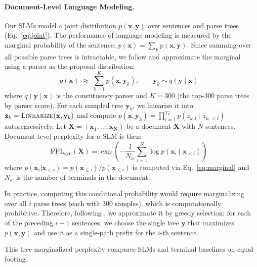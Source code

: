 \documentclass[11pt]{article}
\begin{document}
\paragraph{Document-Level Language Modeling.}
\label{sec:doc-ppl}
Our SLMs model a joint distribution $p(\mathbf{x}, \mathbf{y})$ over sentences and parse trees (Eq.~\ref{eq:joint}). The performance of language modeling is measured by the marginal probability of the sentence: $p(\mathbf{x}) = \sum_{\mathbf{y}} p(\mathbf{x}, \mathbf{y})$.
Since summing over all possible parse trees is intractable, we follow \citet{zhao-etal-2025-systematic} and approximate the marginal using a parser as the proposal distribution:
\begin{equation}
p(\mathbf{x}) \;\approx\; \sum_{k=1}^{K} p(\mathbf{x}, \mathbf{y}_k),
\qquad \mathbf{y}_k \sim q(\mathbf{y} \mid \mathbf{x})
\label{eq:marginal}
\end{equation}
\noindent where $q(\mathbf{y} \mid \mathbf{x})$ is the constituency parser and $K=300$ (the top-300 parse trees by parser score).
For each sampled tree $\mathbf{y}_k$, we linearize it into $\mathbf{z}_k = \textsc{Linearize}(\mathbf{x}, \mathbf{y}_k)$ and compute $p(\mathbf{x}, \mathbf{y}_k) = \prod_{t=1}^{T_k} p(z_{k,t} \mid z_{k,<t})$ autoregressively.
Let $\mathbf{X} = (\mathbf{x_1}, ..., \mathbf{x_N})$ be a document $\mathbf{X}$ with $N$ sentences. 
Document-level perplexity for a SLM is then:
\begin{equation}
\text{PPL}_{\text{syn}}(\mathbf{X}) = \exp\!\left( -\frac{1}{N_w} \sum_{i=1}^{N} \log p(\mathbf{x}_i \mid \mathbf{x}_{<i}) \right)
\label{eq:doc-ppl}
\end{equation}
\noindent where $p(\mathbf{x}_{i} | \mathbf{x}_{< i}) = p(\mathbf{x}_{\le i}) / p(\mathbf{x}_{< i})$ is computed via Eq.~\ref{eq:marginal} and $N_w$ is the number of terminals in the document. 

In practice, computing this conditional probability would require marginalizing over all $i$ parse trees (each with 300 samples), which is computationally prohibitive. 
Therefore, following \citet{sartran-etal-2022-transformer}, we approximate it by greedy selection: for each of the preceding $i-1$ sentences, we choose the single tree $\mathbf{y}$ that maximizes $p(\mathbf{x}, \mathbf{y})$ and use it as a single-path prefix for the $i$-th sentence.

This tree-marginalized perplexity compares SLMs and terminal baselines on equal footing. %
\end{document}
